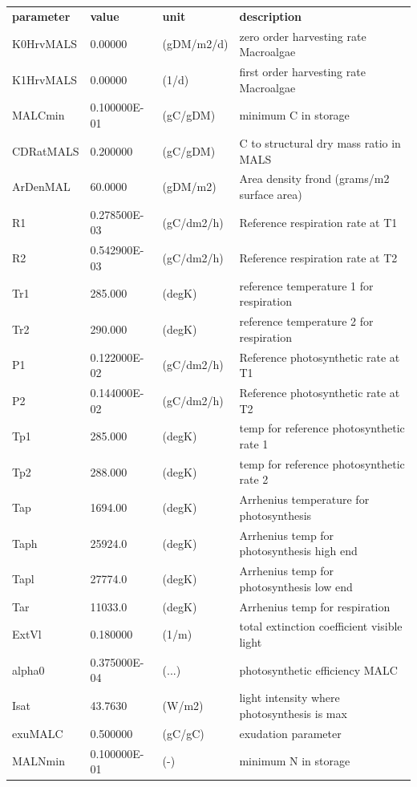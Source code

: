 \documentclass{deltares_manual}
\begin{document}
\begin{longtable}{|l|l|l|l|}

		\hline
		\textbf{parameter} & 	\textbf{value} & 	\textbf{unit} & 	\textbf{description}\\ 
	K0HrvMALS & 0.00000 & (gDM/m2/d) & zero order harvesting rate Macroalgae\\ 
	K1HrvMALS & 0.00000 & (1/d) & first order harvesting rate Macroalgae\\ 
	MALCmin & 0.100000E-01 & (gC/gDM) & minimum C in storage\\ 
	CDRatMALS & 0.200000 & (gC/gDM) & C to structural dry mass ratio in MALS\\ 
	ArDenMAL & 60.0000 & (gDM/m2) & Area density frond (grams/m2 surface area)\\ 
	R1 & 0.278500E-03 & (gC/dm2/h) & Reference respiration rate at T1\\ 
	R2 & 0.542900E-03 & (gC/dm2/h) & Reference respiration rate at T2\\ 
	Tr1 & 285.000 & (degK) & reference temperature 1 for respiration\\ 
	Tr2 & 290.000 & (degK) & reference temperature 2 for respiration\\ 
	P1 & 0.122000E-02 & (gC/dm2/h) & Reference photosynthetic rate at T1\\ 
	P2 & 0.144000E-02 & (gC/dm2/h) & Reference photosynthetic rate at T2\\ 
	Tp1 & 285.000 & (degK) & temp for reference photosynthetic rate 1\\ 
	Tp2 & 288.000 & (degK) & temp for reference photosynthetic rate 2\\ 
	Tap & 1694.00 & (degK) & Arrhenius temperature for photosynthesis\\ 
	Taph & 25924.0 & (degK) & Arrhenius temp for photosynthesis high end\\ 
	Tapl & 27774.0 & (degK) & Arrhenius temp for photosynthesis low end\\ 
	Tar & 11033.0 & (degK) & Arrhenius temp for respiration\\ 
	ExtVl & 0.180000 & (1/m) & total extinction coefficient visible light\\ 
	alpha0 & 0.375000E-04 & (...) & photosynthetic efficiency MALC\\ 
	Isat & 43.7630 & (W/m2) & light intensity where photosynthesis is max\\ 
	exuMALC & 0.500000 & (gC/gC) & exudation parameter\\ 
	MALNmin & 0.100000E-01 & (-) & minimum N in storage\\ 

\end{longtable}
\end{document}
